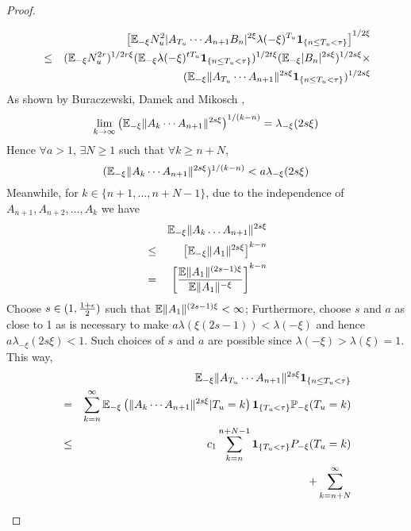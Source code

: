 \documentclass{article}
\theoremstyle{remark}
\begin{document}
\begin{proof}
\begin{enumerate}
\begin{enumerate}
      \begin{eqnarray}
        && \left[ \mathbb{E}_{-\xi} N_u^2 
          |A_{T_u} \cdots A_{n+1} B_n|^{2\xi}
          \lambda(-\xi)^{T_u}
          \mathbf{1}_{\{n \leq T_u < \tau\}} \right]^{1/2\xi} \nonumber \\
        &\leq& (\mathbb{E}_{-\xi} N_u^{2r})^{1/2r\xi}
        (\mathbb{E}_{-\xi} \lambda(-\xi)^{tT_u}\mathbf{1}_{\{n \leq T_u < \tau\}})^{1/2t\xi}
        (\mathbb{E}_{-\xi}|B_n|^{2s\xi})^{1/2s\xi}  \times \nonumber \\
        && (\mathbb{E}_{-\xi} \|A_{T_u} \cdots A_{n+1}\|^{2s\xi}
        \mathbf{1}_{\{n \leq T_u < \tau\}})^{1/2s\xi}
        \label{eq:xi_above_half}
      \end{eqnarray}
      As shown by Buraczewski, Damek
      and Mikosch \cite{BuraczewskiDamekMikosch2015},
      \[
      \lim_{k \to \infty}
      \left( \mathbb{E}_{-\xi}
        \|A_k \cdots A_{n+1}\|^{2s\xi}
      \right)^{1/(k-n)} = \lambda_{-\xi}(2s\xi)
      \]
      Hence $\forall a > 1$, $\exists N \geq 1$ such that $\forall k
      \geq n + N$,
      \[
      (\mathbb{E}_{-\xi}\|A_{k} \cdots A_{n+1}\|^{2s\xi})^{1/(k-n)} <
      a \lambda_{-\xi}(2s\xi)
      \]
      Meanwhile, for $k \in \{n+1, \dots, n+N-1\}$, due to the
      independence of $A_{n+1}, A_{n+2}, \dots, A_k$ we have
      \begin{eqnarray*}
        && \mathbb{E}_{-\xi} \|A_k \dots A_{n+1}\|^{2s\xi} \\
        &\leq& \left[\mathbb{E}_{-\xi} \|A_1\|^{2s\xi}\right]^{k-n} \\
        &=& \left[{\mathbb{E} \|A_1\|^{(2s - 1)\xi} \over \mathbb{E} \|A_1\|^{-\xi}}\right]^{k-n} \\
      \end{eqnarray*}
      Choose $s \in (1, {1 + \epsilon \over 2})$ such that $\mathbb{E}
      \|A_1\|^{(2s - 1)\xi} < \infty$; Furthermore, choose $s$ and $a$
      as close to 1 as is necessary to make $a \lambda(\xi(2s - 1)) <
      \lambda(-\xi)$ and hence $a \lambda_{-\xi}(2s\xi) < 1$. Such
      choices of $s$ and $a$ are possible since $\lambda(-\xi) >
      \lambda(\xi)=1$. This way,
      \begin{eqnarray*}
        && \E_{-\xi} \|A_{T_u} \cdots A_{n+1}\|^{2s\xi}
        \1{n \leq T_u < \tau} \\
        &=& \sum_{k=n}^\infty \E_{-\xi} \left(
          \|A_k \cdots A_{n+1}\|^{2s\xi}|T_u=k\right)
        \1{T_u < \tau} \P_{-\xi}(T_u = k) \\
        &\leq& c_1 \sum_{k=n}^{n+N-1} \1{T_u < \tau}
        P_{-\xi}(T_u = k) \\
        && + \sum_{k=n+N}^\infty

\end{eqnarray*}
\end{enumerate}
\end{enumerate}
\end{proof}
\end{document}
